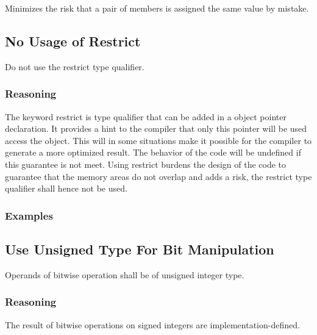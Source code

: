 \documentclass{article}
\begin{document}
Minimizes the risk that a pair of members is assigned the same value by mistake.
\begin{minipage}[t]{0.47\linewidth}

\end{minipage}
\hfill
\begin{minipage}[t]{0.47\linewidth}

\end{minipage}

\subsection{No Usage of Restrict}

Do not use the restrict type qualifier.

\subsubsection{Reasoning}

The keyword restrict is type qualifier that can be added in a object pointer declaration. It provides a hint to the compiler that only this pointer will be used access the object. This will in some situations make it possible for the compiler to generate a more optimized result. The behavior of the code will be undefined if this guarantee is not meet. Using restrict burdens the design of the code to guarantee that the memory areas do not overlap and adds a risk, the restrict type qualifier shall hence not be used.

\subsubsection{Examples}

\begin{minipage}[t]{0.47\linewidth}

\end{minipage}
\hfill
\begin{minipage}[t]{0.47\linewidth}

\end{minipage}

\subsection{Use Unsigned Type For Bit Manipulation}

Operands of bitwise operation shall be of unsigned integer type.

\subsubsection{Reasoning}

The result of bitwise operations on signed integers are implementation-defined.
\end{document}

